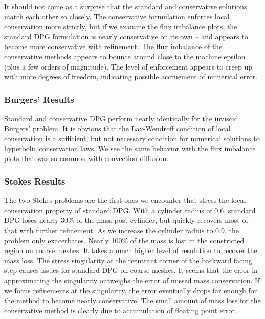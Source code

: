 \documentclass[Proposal.tex]{subfiles}
\begin{document}
It should not come as a surprise that the standard and conservative
solutions match each other so closely. The conservative formulation
enforces local conservation more strictly, but if we examine the flux
imbalance plots, the standard DPG formulation is nearly conservative on its
own -- and appears to become more conservative with refinement. The flux
imbalance of the conservative methods appears to bounce around close to the
machine epsilon (plus a few orders of magnitude). The level of enforcement
appears to creep up with more degrees of freedom, indicating possible
accruement of numerical error.

\subsubsection{Burgers' Results}
Standard and conservative DPG perform nearly identically for the
inviscid Burgers' problem. It is obvious that the Lax-Wendroff condition of
local conservation is a sufficient, but not necessary condition for numerical
solutions to hyperbolic conservation laws. We see the same behavior with the
flux imbalance plots that was so common with convection-diffusion.

\subsubsection{Stokes Results}
The two Stokes problems are the first ones we encounter that stress the local
conservation property of standard DPG. With a cylinder radius of $0.6$,
standard DPG loses nearly 30\% of the mass post-cylinder, but quickly recovers
most of that with further refinement. As we increase the cylinder radius to
$0.9$, the problem only exacerbates. Nearly 100\% of the mass is lost in the
constricted region on coarse meshes. It takes a much higher level of
resolution to recover the mass loss. The stress singularity at the reentrant
corner of the backward facing step causes issues for standard DPG on coarse
meshes. It seems that the error in approximating the singularity outweighs the
error of missed mass conservation. If we focus refinements at the singularity,
the error eventually drops far enough for the method to become nearly
conservative.
The small amount of mass loss for the conservative method is clearly due to
accumulation of floating point error.
\end{document}
